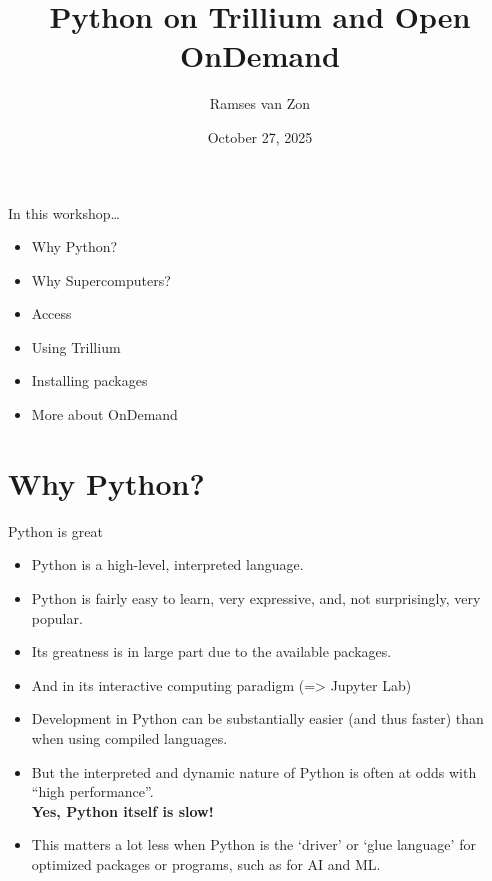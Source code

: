 \documentclass[
  10pt,
  ignorenonframetext,
  aspectratio=169]{beamer}
\title{Python on Trillium and Open OnDemand}
\author{Ramses van Zon}
\date{October 27, 2025}
\begin{document}
\frame{\titlepage}

\begin{frame}{In this workshop\ldots{}}
\label{in-this-workshop}
\begin{itemize}
\item
  Why Python?
\item
  Why Supercomputers?
\item
  Access
\item
  Using Trillium
\item
  Installing packages
\item
  More about OnDemand
\end{itemize}
\end{frame}

\section{Why Python?}\label{why-python}

\begin{frame}{Python is great}
\label{python-is-great}
\begin{itemize}
\item
  Python is a high-level, interpreted language.

  \pause
\item
  Python is fairly easy to learn, very expressive, and, not surprisingly, very popular.

  \pause
\item
  Its greatness is in large part due to the available packages.

  \pause
\item
  And in its interactive computing paradigm (=\textgreater{} Jupyter Lab)

  \pause
\item
  Development in Python can be substantially easier (and thus faster) than when using compiled languages.

  \pause
\item
  But the interpreted and dynamic nature of Python is often at odds with ``high performance''.\\
  \textbf{Yes, Python itself is slow!}

  \pause
\item
  This matters a lot less when Python is the `driver' or `glue language' for optimized packages or programs, such as for AI and ML.
\end{itemize}
\end{frame}
\end{document}
